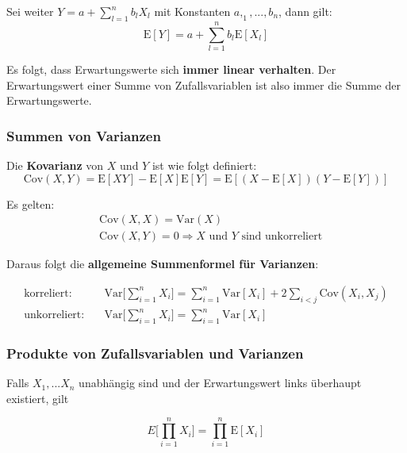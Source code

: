 \documentclass[11pt]{article}
\newcommand{\E}{\text{E}}
\newcommand{\Var}{\text{Var}}
\newcommand{\Cov}{\text{Cov}}
\begin{document}
Sei weiter $Y = a + \sum_{l=1}^n b_lX_l$ mit Konstanten $a,_1,...,b_n$, dann gilt:
\begin{equation*}
	\E[Y] = a + \sum_{l=1}^n b_l\E[X_l]
\end{equation*}

Es folgt, dass Erwartungswerte sich \textbf{immer linear verhalten}. Der Erwartungswert einer Summe von Zufallsvariablen ist also immer die Summe der Erwartungswerte.
	
\subsubsection{Summen von Varianzen}

Die \textbf{Kovarianz} von $X$ und $Y$ ist wie folgt definiert:
\begin{equation*}
	\Cov(X,Y) = \E[XY] - \E[X]\E[Y] = \E[(X - \E[X])(Y-\E[Y])]
\end{equation*}

Es gelten:
\begin{equation*}
\begin{split}
	& \Cov(X, X) = \Var(X) \\
	& \Cov(X, Y) = 0 \Rightarrow \text{$X$ und $Y$ sind unkorreliert}
\end{split}
\end{equation*}

Daraus folgt die \textbf{allgemeine Summenformel f{\"u}r Varianzen}:

\begin{equation*}
\begin{split}
	\text{korreliert:} \quad & \Var\Bigg[\sum_{i=1}^n X_i \Bigg] = \sum_{i=1}^n\Var[X_i] + 2\sum_{i<j}\Cov(X_i, X_j) \\
	\text{unkorreliert:} \quad & \Var\Bigg[\sum_{i=1}^n X_i \Bigg] = \sum_{i=1}^n\Var[X_i]
\end{split}
\end{equation*}

\subsubsection{Produkte von Zufallsvariablen und Varianzen}

Falls $X_1,...X_n$ unabh{\"a}ngig sind und der Erwartungswert links {\"u}berhaupt existiert, gilt

\begin{equation*}
	E\Bigg[\prod_{i=1}^n X_i\Bigg] = \prod_{i=1}^n \E[X_i]
\end{equation*}
\end{document}
